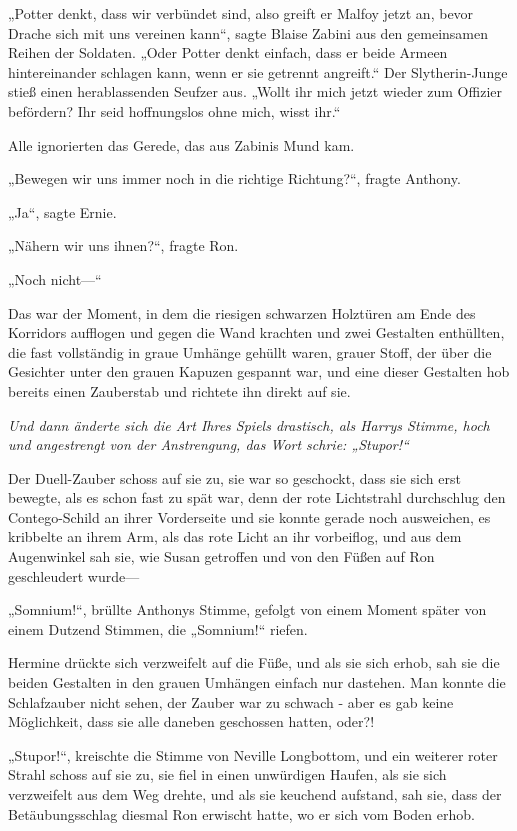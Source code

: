 {„Potter denkt, dass wir verbündet sind, also greift er Malfoy jetzt an, bevor Drache sich mit uns vereinen kann“, sagte Blaise Zabini aus den gemeinsamen Reihen der Soldaten. „Oder Potter denkt einfach, dass er beide Armeen hintereinander schlagen kann, wenn er sie getrennt angreift.“ Der Slytherin-Junge stieß einen herablassenden Seufzer aus. „Wollt ihr mich jetzt wieder zum Offizier befördern? Ihr seid hoffnungslos ohne mich, wisst ihr.“

Alle ignorierten das Gerede, das aus Zabinis Mund kam.

„Bewegen wir uns immer noch in die richtige Richtung?“, fragte Anthony.

„Ja“, sagte Ernie.

„Nähern wir uns ihnen?“, fragte Ron.

„Noch nicht—“

Das war der Moment, in dem die riesigen schwarzen Holztüren am Ende des Korridors aufflogen und gegen die Wand krachten und zwei Gestalten enthüllten, die fast vollständig in graue Umhänge gehüllt waren, grauer Stoff, der über die Gesichter unter den grauen Kapuzen gespannt war, und eine dieser Gestalten hob bereits einen Zauberstab und richtete ihn direkt auf sie.

\emph{Und dann änderte sich die Art Ihres Spiels drastisch, als Harrys Stimme, hoch und angestrengt von der Anstrengung, das Wort schrie: „Stupor!“}

Der Duell-Zauber schoss auf sie zu, sie war so geschockt, dass sie sich erst bewegte, als es schon fast zu spät war, denn der rote Lichtstrahl durchschlug den Contego-Schild an ihrer Vorderseite und sie konnte gerade noch ausweichen, es kribbelte an ihrem Arm, als das rote Licht an ihr vorbeiflog, und aus dem Augenwinkel sah sie, wie Susan getroffen und von den Füßen auf Ron geschleudert wurde—

„Somnium!“, brüllte Anthonys Stimme, gefolgt von einem Moment später von einem Dutzend Stimmen, die „Somnium!“ riefen.

Hermine drückte sich verzweifelt auf die Füße, und als sie sich erhob, sah sie die beiden Gestalten in den grauen Umhängen einfach nur dastehen. Man konnte die Schlafzauber nicht sehen, der Zauber war zu schwach - aber es gab keine Möglichkeit, dass sie alle daneben geschossen hatten, oder?!

„Stupor!“, kreischte die Stimme von Neville Longbottom, und ein weiterer roter Strahl schoss auf sie zu, sie fiel in einen unwürdigen Haufen, als sie sich verzweifelt aus dem Weg drehte, und als sie keuchend aufstand, sah sie, dass der Betäubungsschlag diesmal Ron erwischt hatte, wo er sich vom Boden erhob.

}
